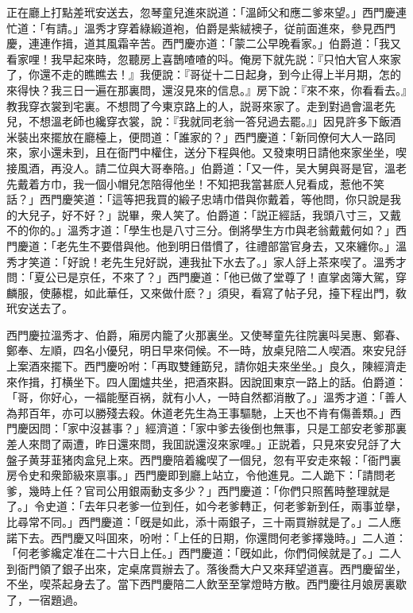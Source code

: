 正在廳上打點差玳安送去，忽琴童兒進來説道：「溫師父和應二爹來望。」西門慶連忙道：「有請。」溫秀才穿着綠緞道袍，伯爵是紫絨襖子，従前面進來，參見西門慶，連連作揖，道其風霜辛苦。西門慶亦道：「蒙二公早晚看家。」伯爵道：「我又看家哩！我早起來時，忽聽房上喜鵲喳喳的呌。俺房下就先説：『只怕大官人來家了，你還不走的瞧瞧去！』我便說：『哥従十二日起身，到今止得上半月期，怎的來得快？我三日一遍在那裏問，還沒見來的信息。』房下說：『來不來，你看看去。』教我穿衣裳到宅裏。不想問了今東京路上的人，説哥來家了。走到對過會溫老先兒，不想溫老師也纔穿衣裳，說：『我就同老翁一答兒過去罷。』」因見許多下飯酒米裝出來擺放在廳檯上，便問道：「誰家的？」西門慶道：「新同僚何大人一路同來，家小還未到，且在衙門中權住，送分下程與他。又發柬明日請他來家坐坐，喫接風酒，再没人。請二位與大哥奉陪。」伯爵道：「又一件，吴大舅與哥是官，溫老先戴着方巾，我一個小帽兒怎陪得他坐！不知把我當甚麽人兒看成，惹他不笑話？」西門慶笑道：「這等把我買的緞子忠靖巾借與你戴着，等他問，你只說是我的大兒子，好不好？」説畢，衆人笑了。伯爵道：「説正經話，我頭八寸三，又戴不的你的。」溫秀才道：「學生也是八寸三分。倒將學生方巾與老翁戴戴何如？」西門慶道：「老先生不要借與他。他到明日借慣了，往禮部當官身去，又來纏你。」溫秀才笑道：「好說！老先生兒好説，連我扯下水去了。」家人㧱上茶來喫了。溫秀才問：「夏公已是京任，不來了？」西門慶道：「他已做了堂尊了！直掌卤簿大駕，穿麟服，使藤棍，如此華任，又來做什麽？」須臾，看寫了帖子兒，擡下程出門，敎玳安送去了。

西門慶拉溫秀才、伯爵，廂房内籠了火那裏坐。又使琴童先往院裏呌吴惠、鄭春、鄭奉、左順，四名小優兒，明日早來伺候。不一時，放桌兒陪二人喫酒。來安兒㧱上案酒來擺下。西門慶吩咐：「再取雙鍾筯兒，請你姐夫來坐坐。」良久，陳經濟走來作揖，打横坐下。四人圍爐共坐，把酒來斟。因說囬東京一路上的話。伯爵道：「哥，你好心，一福能壓百祸，就有小人，一時自然都消散了。」溫秀才道：「善人為邦百年，亦可以勝殘去殺。休道老先生為王事驅馳，上天也不肯有傷善類。」西門慶因問：「家中沒甚事？」經濟道：「家中爹去後倒也無事，只是工部安老爹那裏差人來問了兩遭，昨日還來問，我囬説還沒來家哩。」正説着，只見來安兒㧱了大盤子黄芽韮猪肉盒兒上來。西門慶陪着纔喫了一個兒，忽有平安走來報：「衙門裏房令史和衆節級來禀事。」西門慶即到廳上站立，令他進見。二人跪下：「請問老爹，幾時上任？官司公用銀兩動支多少？」西門慶道：「你們只照舊時整理就是了。」令史道：「去年只老爹一位到任，如今老爹轉正，何老爹新到任，兩事並擧，比尋常不同。」西門慶道：「旣是如此，添十兩銀子，三十兩買辦就是了。」二人應諾下去。西門慶又呌囬來，吩咐：「上任的日期，你還問何老爹擇幾時。」二人道：「何老爹纔定准在二十六日上任。」西門慶道：「旣如此，你們伺候就是了。」二人到衙門領了銀子出來，定桌席買辦去了。落後喬大户又來拜望道喜。西門慶留坐，不坐，喫茶起身去了。當下西門慶陪二人飲至至掌燈時方散。西門慶往月娘房裏歇了，一宿題過。

